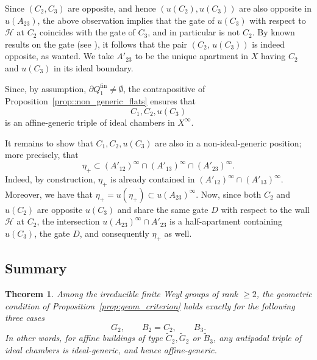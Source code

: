\documentclass[11pt]{amsart}
\theoremstyle{plain}
\newtheorem{thm}{Theorem}[section]
\theoremstyle{definition}
\theoremstyle{remark}
\begin{document}
	
	Since \((C_{2}, C_{3})\) are opposite, and hence \((u(C_{2}), u(C_{3}))\) are also opposite in $u(A_{23})$, 
	the above observation implies that the gate of \(u(C_{3})\) with respect to 
	\(\mathcal{H}\) at \(C_{2}\) coincides with the gate of \(C_{3}\), and in particular 
	is not \(C_{2}\). By known results on the gate (see \cite[Propositions 3.103 and 3.105]{abramenko_brown08}), it follows that the pair 
	\((C_{2},\, u(C_{3}))\) is indeed opposite, as wanted. We take $A'_{23}$ to be the unique apartment in $X$ having $C_2$ and $u(C_3)$ in its ideal boundary.
	
	Since, by assumption, \(\partial Q_{1}^{\mathrm{fin}} \neq \emptyset\), the contrapositive of Proposition~\ref{prop::non_generic_flats} ensures that 
	$$C_{1}, C_{2}, u(C_{3})$$
	is an affine-generic triple of ideal chambers in \(X^\infty\). 
	
	It remains to show that $C_{1}, C_{2}, u(C_{3})$ are also in a non-ideal-generic position; more precisely, that 
	$$\eta_+ \subset (A'_{12})^\infty \cap (A'_{13})^\infty \cap (A'_{23})^\infty.$$
 Indeed, by construction, $\eta_+$ is already contained in $(A'_{12})^\infty \cap (A'_{13})^\infty$. Moreover, we have
that $\eta_+ =u(\eta_+)  \subset u(A_{23})^{\infty}$. Now, since both $C_2$ and $u(C_2)$ are opposite $u(C_3)$ and share the same gate $D$ with respect to the wall $\mathcal{H}$ at $C_2$, the intersection $u(A_{23})^{\infty} \cap A'_{23}$  is a half-apartment containing $u(C_3)$, the gate $D$, and consequently $\eta_+$ as well.
	

	
	\subsection{Summary}
	
	\begin{thm}\label{thm:summary}
		Among the irreducible finite Weyl groups of rank $\ge 2$,  the geometric condition of Proposition~\ref{prop:geom_criterion} holds exactly for the following three cases
		\[
		G_2,\qquad B_2=C_2,\qquad B_3.
		\]
		In other words, for affine buildings of type $\widetilde C_2, \widetilde G_2$ or $\widetilde B_3$, any antipodal triple of ideal chambers is ideal-generic, and hence affine-generic. 
	\end{thm}
	
\end{document}
